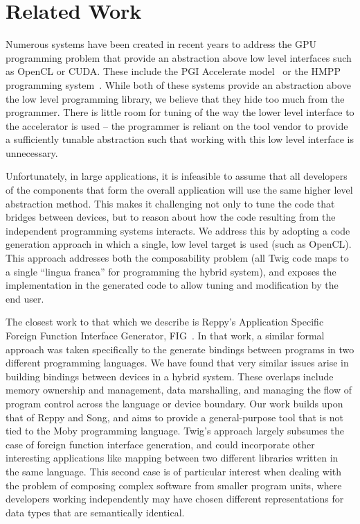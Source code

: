 
\section{Related Work}

Numerous systems have been created in recent years to address the GPU
programming problem that provide an abstraction above low level interfaces such
as OpenCL or CUDA. These include the PGI Accelerate model~\cite{pgi-accelerate}
or the HMPP programming system~\cite{hmpp}. While both of these systems provide
an abstraction above the low level programming library, we believe that they
hide too much from the programmer. There is little room for tuning of the way
the lower level interface to the accelerator is used -- the programmer is
reliant on the tool vendor to provide a sufficiently tunable abstraction such
that working with this low level interface is unnecessary.

Unfortunately, in large applications, it is infeasible to assume that all
developers of the components that form the overall application will use the same
higher level abstraction method. This makes it challenging not only to tune the
code that bridges between devices, but to reason about how the code resulting
from the independent programming systems interacts. We address this by adopting
a code generation approach in which a single, low level target is used (such as
OpenCL). This approach addresses both the composability problem (all Twig code
maps to a single ``lingua franca'' for programming the hybrid system), and
exposes the implementation in the generated code to allow tuning and
modification by the end user.

The closest work to that which we describe is Reppy's Application Specific
Foreign Function Interface Generator, FIG~\cite{reppy06fig}. In that work, a
similar formal approach was taken specifically to the generate bindings between
programs in two different programming languages. We have found that very similar
issues arise in building bindings between devices in a hybrid system. These
overlaps include memory ownership and management, data marshalling, and managing
the flow of program control across the language or device boundary. Our work
builds upon that of Reppy and Song, and aims to provide a general-purpose tool
that is not tied to the Moby programming language. Twig's approach largely
subsumes the case of foreign function interface generation, and could
incorporate other interesting applications like mapping between two different
libraries written in the same language. This second case is of particular
interest when dealing with the problem of composing complex software from
smaller program units, where developers working independently may have chosen
different representations for data types that are semantically identical.

